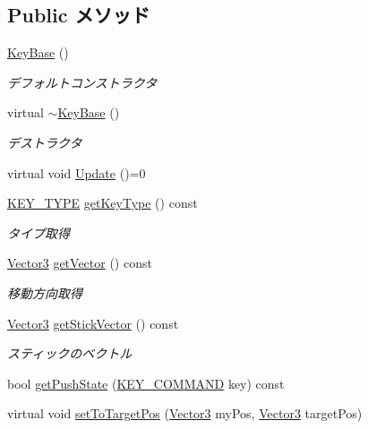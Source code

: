 \subsection*{Public メソッド}
\begin{DoxyCompactItemize}
\item 
\hyperlink{class_key_base_a647f31cb6653cd682d974cc64df899a2}{Key\-Base} ()
\begin{DoxyCompactList}\small\item\em デフォルトコンストラクタ \end{DoxyCompactList}\item 
virtual \hyperlink{class_key_base_ac9fdcf292389d3bf4ae69974e32aea58}{$\sim$\-Key\-Base} ()
\begin{DoxyCompactList}\small\item\em デストラクタ \end{DoxyCompactList}\item 
virtual void \hyperlink{class_key_base_a606340a0f380b698faed323e108bb1f9}{Update} ()=0
\item 
\hyperlink{class_key_base_ab22168ade2e4ac686bb475648df75095}{K\-E\-Y\-\_\-\-T\-Y\-P\-E} \hyperlink{class_key_base_ad80a94efb6d8e4f05ca7109c997d1cdf}{get\-Key\-Type} () const 
\begin{DoxyCompactList}\small\item\em タイプ取得 \end{DoxyCompactList}\item 
\hyperlink{struct_vector3}{Vector3} \hyperlink{class_key_base_ac50fde0306def82116ada72fb194bb14}{get\-Vector} () const 
\begin{DoxyCompactList}\small\item\em 移動方向取得 \end{DoxyCompactList}\item 
\hyperlink{struct_vector3}{Vector3} \hyperlink{class_key_base_af957b878e28cbe4ed9135684e6c78b1e}{get\-Stick\-Vector} () const 
\begin{DoxyCompactList}\small\item\em スティックのベクトル \end{DoxyCompactList}\item 
bool \hyperlink{class_key_base_a15c8c17b7af09dbfa358309fc9a430f9}{get\-Push\-State} (\hyperlink{class_key_base_a6e2d2326afadb1405879b31e4463e45f}{K\-E\-Y\-\_\-\-C\-O\-M\-M\-A\-N\-D} key) const 
\item 
virtual void \hyperlink{class_key_base_a3524c7ef9f4528a354e4ccfd57a8848e}{set\-To\-Target\-Pos} (\hyperlink{struct_vector3}{Vector3} my\-Pos, \hyperlink{struct_vector3}{Vector3} target\-Pos)

\end{DoxyCompactItemize}
